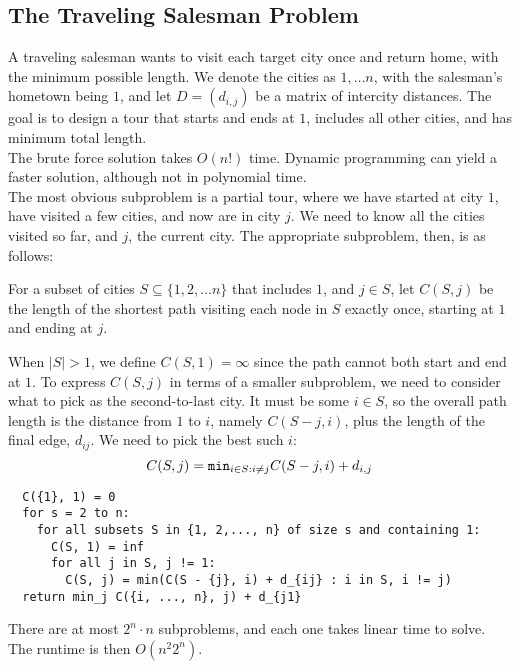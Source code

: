 \subsection{The Traveling Salesman Problem}
A traveling salesman wants to visit each target city once and return home, with the minimum possible length.
We denote the cities as $1, \ldots n$, with the salesman's hometown being $1$, and let $D = (d_{i, j})$ be a matrix of intercity distances.
The goal is to design a tour that starts and ends at $1$, includes all other cities, and has minimum total length.\\
The brute force solution takes $O(n!)$ time.
Dynamic programming can yield a faster solution, although not in polynomial time.\\
The most obvious subproblem is a partial tour, where we have started at city $1$, have visited a few cities, and now are in city $j$.
We need to know all the cities visited so far, and $j$, the current city.
The appropriate subproblem, then, is as follows:
\begin{center}
  For a subset of cities $S \subseteq \{1, 2,\ldots n\}$ that includes $1$, and $j \in S$, let $C(S, j)$ be the length of the shortest path visiting each node in $S$ exactly once, starting at $1$ and ending at $j$.
\end{center}
When $|S| > 1$, we define $C(S, 1) = \infty$ since the path cannot both start and end at $1$.
To express $C(S, j)$ in terms of a smaller subproblem, we need to consider what to pick as the second-to-last city.
It must be some $i \in S$, so the overall path length is the distance from $1$ to $i$, namely $C(S - {j}, i)$, plus the length of the final edge, $d_{ij}$.
We need to pick the best such $i$: $$C(S, j) = \verb|min|_{i \in S: i \not= j} C(S - {j}, i) + d_{i, j}$$
\begin{verbatim}
  C({1}, 1) = 0
  for s = 2 to n:
    for all subsets S in {1, 2,..., n} of size s and containing 1:
      C(S, 1) = inf
      for all j in S, j != 1:
        C(S, j) = min(C(S - {j}, i) + d_{ij} : i in S, i != j)
  return min_j C({i, ..., n}, j) + d_{j1}
\end{verbatim}
There are at most $2^n \cdot n$ subproblems, and each one takes linear time to solve.
The runtime is then $O(n^2 2^n)$.

